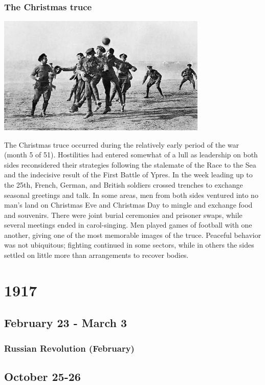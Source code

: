 \documentclass[11pt]{report}
\begin{document}
\subsection{The Christmas truce}
\vspace{2mm}\begin{center}\includegraphics[width=10cm]{./img/christmasTruce.jpg}\end{center}
The Christmas truce occurred during the relatively early period of the war (month 5 of 51). Hostilities had entered somewhat of a lull as leadership on both sides reconsidered their strategies following the stalemate of the Race to the Sea and the indecisive result of the First Battle of Ypres. In the week leading up to the 25th, French, German, and British soldiers crossed trenches to exchange seasonal greetings and talk. In some areas, men from both sides ventured into no man's land on Christmas Eve and Christmas Day to mingle and exchange food and souvenirs. There were joint burial ceremonies and prisoner swaps, while several meetings ended in carol-singing. Men played games of football with one another, giving one of the most memorable images of the truce. Peaceful behavior was not ubiquitous; fighting continued in some sectors, while in others the sides settled on little more than arrangements to recover bodies.

\chapter{1917}
\section{February 23 - March 3}
\subsection{Russian Revolution (February)}
\section{October 25-26}
\end{document}

